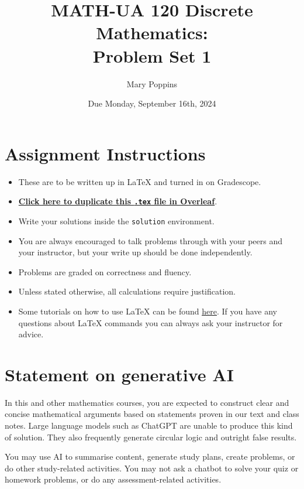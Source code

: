 \documentclass{article}
\title{\textbf{MATH-UA 120 Discrete Mathematics: \\ Problem Set 1}}
\author{%
    Mary Poppins %
}
\date{Due Monday, September 16th, 2024} %
\theoremstyle{definition}
\begin{document}
\maketitle %

\vfill

\section*{Assignment Instructions}

\begin{itemize}
    \item These are to be written up in \LaTeX{} and turned in on Gradescope.
    \item \href{https://bit.ly/4d4g2BH}{\textbf{Click here to duplicate this \texttt{.tex} file in Overleaf}}.
    \item Write your solutions inside the \texttt{solution} environment.
    \item You are always encouraged to talk problems through with your peers and your instructor, but your write up should be done independently.
    \item Problems are graded on correctness and fluency.
    \item Unless stated otherwise, all calculations require justification.
    \item Some tutorials on how to use \LaTeX{} can be found \href{https://www.overleaf.com/learn/latex/Tutorials}{\underline{here}}. If you have any questions about \LaTeX{} commands you can always ask your instructor for advice.
\end{itemize}

\vfill

\section*{Statement on generative AI}

In this and other mathematics courses, you are expected to construct clear and concise mathematical arguments based on statements proven in our text and class notes. Large language models such as ChatGPT are unable to produce this kind of solution. They also frequently generate circular logic and outright false results.
 
You may use AI to summarise content, generate study plans, create problems, or do other study-related activities. You may not ask a chatbot to solve your quiz or homework problems, or do any assessment-related activities.
 
\end{document}
